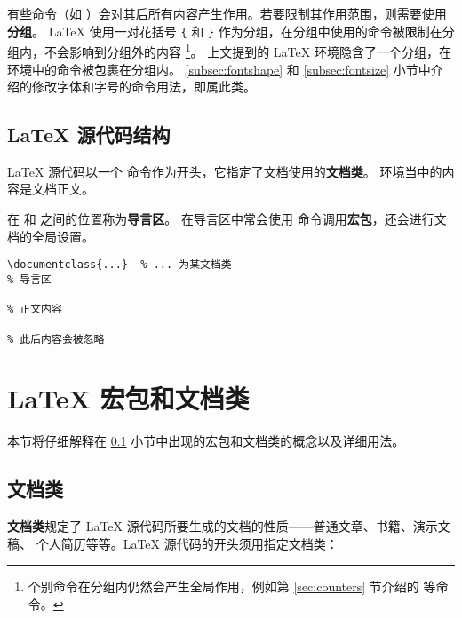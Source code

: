 有些命令（如 ）会对其后所有内容产生作用。若要限制其作用范围，则需要使用\textbf{分组}。
\LaTeX{} 使用一对花括号 \verb|{| 和 \verb|}| 作为分组，在分组中使用的命令被限制在分组内，不会影响到分组外的内容%
\footnote{个别命令在分组内仍然会产生全局作用，例如第 \ref{sec:counters} 节介绍的  等命令。}。
上文提到的 \LaTeX{} 环境隐含了一个分组，在环境中的命令被包裹在分组内。
\ref{subsec:fontshape} 和 \ref{subsec:fontsize} 小节中介绍的修改字体和字号的命令用法，即属此类。

\subsection{\LaTeX{} 源代码结构}\label{subsec:struct}

\LaTeX{} 源代码以一个  命令作为开头，它指定了文档使用的\textbf{文档类}。
 环境当中的内容是文档正文。

在  和  之间的位置称为\textbf{导言区}。
在导言区中常会使用  命令调用\textbf{宏包}，还会进行文档的全局设置。
\begin{verbatim}
\documentclass{...}  % ... 为某文档类
% 导言区

% 正文内容

% 此后内容会被忽略
\end{verbatim}

\section{\LaTeX{} 宏包和文档类}\label{sec:latex-pkgs}

本节将仔细解释在 \ref{subsec:struct} 小节中出现的宏包和文档类的概念以及详细用法。

\subsection{文档类}\label{subsec:classes}

\textbf{文档类}规定了 \LaTeX{} 源代码所要生成的文档的性质——普通文章、书籍、演示文稿、
个人简历等等。\LaTeX{} 源代码的开头须用指定文档类：
\begin{command}
\end{command}

